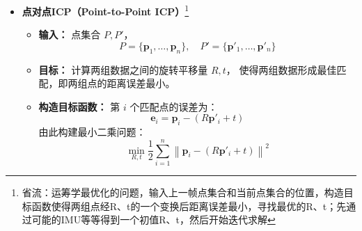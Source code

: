 \documentclass[../main.tex]{subfiles}
\begin{document}
\begin{enumerate}
\begin{itemize}
        \item \textbf{点对点ICP（Point-to-Point ICP）}\footnote{省流：运筹学最优化的问题，输入上一帧点集合和当前点集合的位置，构造目标函数使得两组点经R、t的一个变换后距离误差最小，寻找最优的R、t；先通过可能的IMU等等得到一个初值R、t，然后开始迭代求解}
        \begin{itemize}
            \item \textbf{输入：}  
            点集合 \( P, P' \)，
            \[
            P = \{ \mathbf{p}_1, \dots, \mathbf{p}_n \}, \quad P' = \{ \mathbf{p}'_1, \dots, \mathbf{p}'_n \}
            \]

            \item \textbf{目标：}  
            计算两组数据之间的旋转平移量 \( R, t \)，
            使得两组数据形成最佳匹配，即两组点的距离误差最小。

            \item \textbf{构造目标函数：}  
            第 \( i \) 个匹配点的误差为：
            \[
            \mathbf{e}_i = \mathbf{p}_i - (R \mathbf{p}'_i + t)
            \]
            由此构建最小二乘问题：
            \[
            \min_{R, t} \frac{1}{2} \sum_{i=1}^{n} \left\| \mathbf{p}_i - (R \mathbf{p}'_i + t) \right\|^2
            \]
\end{itemize}
\end{itemize}
\end{enumerate}
\end{document}
